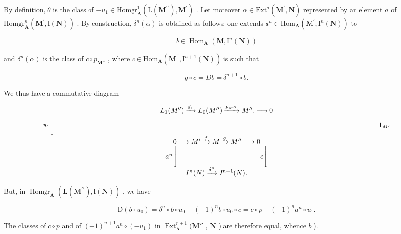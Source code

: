 By definition, \(\theta\) is the class of \(-u_{1}\in\mathrm{Homgr}_{\mathbf{A}}^{1}(\mathrm{L}(\mathbf{M}^{\prime\prime}),\mathbf{M}^{\prime})\) . Let moreover \(\alpha\in\mathrm{Ext}^{n}(\mathbf{M}^{\prime},\mathbf{N})\) represented by an element \(a\) of \(\mathrm{Homgr}_{\mathbf{A}}^{n}(\mathbf{M}^{\prime},\mathrm{I}(\mathbf{N}))\) . By construction, \(\delta^{n}(\alpha)\) is obtained as follows: one extends \(a^{n}\in\mathrm{Hom}_{\mathbf{A}}(\mathbf{M}^{\prime},\mathrm{I}^{n}(\mathbf{N}))\) to

\[
b \in \operatorname{Hom} _ {\mathbf {A}} (\mathbf {M}, \mathrm{I} ^ {n} (\mathbf {N}))
\]

and \(\delta^n (\alpha)\) is the class of \(c\circ p_{\mathbf{M}''}\) , where \(c\in \mathrm{Hom}_{\mathbf{A}}(\mathbf{M}^{\prime \prime},\mathrm{I}^{n + 1}(\mathbf{N}))\) is such that

\[
g \circ c = D b = \delta^ {n + 1} \circ b.
\]

We thus have a commutative diagram

\[
\begin{array}{c} L _ {1} (M ^ {\prime \prime}) \xrightarrow {d _ {1}} L _ {0} (M ^ {\prime \prime}) \xrightarrow {p _ {M ^ {\prime \prime}}} M ^ {\prime \prime}. \longrightarrow 0 \\ u _ {1} \Biggl \downarrow \quad \quad \quad \quad \quad \quad \quad \quad \quad \quad \quad \quad \quad \quad \quad \quad \quad \quad \quad \quad \quad \quad \quad \quad \quad \quad \quad \quad \quad \quad \quad \quad \quad \quad \quad \quad \quad \quad \quad \quad \quad \quad \quad \quad \quad \quad \quad 1 _ {M ^ {\prime}} \\ 0 \longrightarrow M ^ {\prime} \xrightarrow {f} M \xrightarrow {g} M ^ {\prime \prime} \longrightarrow 0 \\ a ^ {n} \Biggl \downarrow \quad \quad \quad \quad \quad \quad \quad \quad \quad \quad \quad \quad c \Biggl \downarrow \\ I ^ {n} (N) \xrightarrow {\delta^ {n}} I ^ {n + 1} (N). \end{array}
\]

But, in \(\operatorname{Homgr}_{\mathbf{A}}(\mathbf{L}(\mathbf{M}^{\prime \prime}),\mathbf{l}(\mathbf{N}))\) , we have

\[
\mathrm{D} (b \circ u _ {0}) = \delta^ {n} \circ b \circ u _ {0} - (- 1) ^ {n} b \circ u _ {0} \circ c = c \circ p - (- 1) ^ {n} a ^ {n} \circ u _ {1}.
\]

The classes of \(c \circ p\) and of \((-1)^{n+1} a^n \circ (-u_1)\) in \(\operatorname{Ext}_{\mathbf{A}}^{n+1} (\mathbf{M}''\) , \(\mathbf{N}\) ) are therefore equal, whence \(b\) ).

